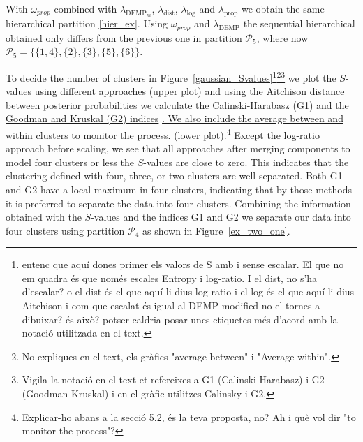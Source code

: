 \documentclass[submit]{smj}
\theoremstyle{definition}
\begin{document}
With $\omega_{prop}$ combined with $\lambda_{\text{DEMP}_m}$, $\lambda_{\text{dist}}$, $\lambda_{\log}$ and $\lambda_{\text{prop}}$ we obtain the same hierarchical partition \ref{hier_ex}. Using $\omega_{prop}$ and $\lambda_{\text{DEMP}}$ the sequential hierarchical obtained only differs from the previous one  in partition $\mathcal{P}_5$, where now $\mathcal{P}_5 = \{\{1, 4\},\{2\}, \{3\},\{5\},\{6\} \}$.

To decide the number of clusters in Figure~\ref{gaussian_Svalues}\footnote{entenc que aquí dones primer els valors de S amb i sense escalar. El que no em quadra és que només escales Entropy i log-ratio. I el dist, no s'ha d'escalar? o el dist és el que aquí li dius log-ratio i el log és el que aquí li dius Aitchison i com que escalat és igual al DEMP modified no el tornes a dibuixar? és això? potser caldria posar unes etiquetes més d'acord amb la notació utilitzada en el text.}\footnote{No expliques en el text, els gràfics "average between" i "Average within".}\footnote{Vigila la notació en el text et refereixes a G1 (Calinski-Harabasz) i G2 (Goodman-Kruskal) i en el gràfic utilitzes Calinsky i G2. } we plot the $S$-values using different approaches (upper plot) and using the Aitchison distance between posterior probabilities \ul{we calculate the Calinski-Harabasz (G1) and the Goodman and Kruskal (G2) indices} \citep{milligan1985}\ul{. We also include the average between and within clusters to monitor the process. (lower plot)}.\footnote{Explicar-ho abans a la secció 5.2, és la teva proposta, no? Ah i què vol dir "to monitor the process"?}  Except the log-ratio approach before scaling, we see that all approaches after merging components to model four clusters or less the $S$-values are close to zero. This indicates that the clustering defined with four, three, or two clusters are well separated. Both G1 and G2 have a local maximum in four clusters, indicating that by those methods it is preferred to separate the data into four clusters. Combining the information obtained with the $S$-values and the indices G1 and G2 we separate our data into four clusters using partition $\mathcal{P}_4$ as shown in Figure~\ref{ex_two_one}.
\end{document}
